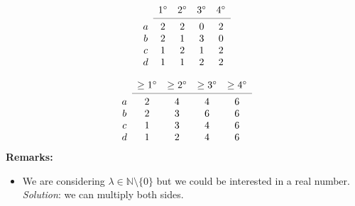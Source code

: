 \[
\begin{array}{ccccc}
& 1^\circ
& 2^\circ
& 3^\circ
& 4^\circ \\
\cmidrule{2-5}
a 
& 2
& 2
& 0
& 2 \\
b
& 2
& 1
& 3
& 0 \\
c
& 1
& 2
& 1
& 2 \\
d
& 1
& 1
& 2
& 2 \\
\end{array}
\]

\[
\begin{array}{ccccc}
& \geq 1^\circ
& \geq 2^\circ
& \geq 3^\circ
& \geq 4^\circ \\
\cmidrule{2-5}
a 
& 2
& 4
& 4
& 6 \\
b
& 2
& 3
& 6
& 6 \\
c
& 1
& 3
& 4
& 6 \\
d
& 1
& 2
& 4
& 6 \\
\end{array}
\]
\textbf{Remarks:}
\begin{itemize}
	\item We are considering $\lambda \in \mathbb{N} \setminus \{0\}$ but we could be interested in a real number. \textit{Solution}: we can multiply both sides.
\end{itemize}
\fi
  
